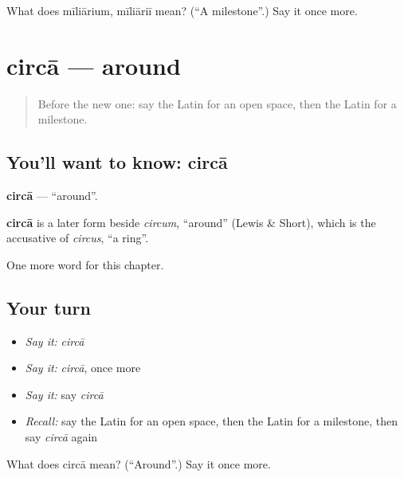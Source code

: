 \begin{tcolorbox}[breakable,colback=teal!4,colframe=teal!35!black,title={Before you move on}]
What does mīliārium, mīliāriī mean? (\textquotedblleft{}A milestone\textquotedblright{}.) Say it once more.
\end{tcolorbox}
\section[circā]{circā — around}

\label{lesson:LA-C119-circa}



\begin{quote}
Before the new one: say the Latin for an open space, then the Latin for a milestone.
\end{quote}

\subsection*{You'll want to know: circā}
\textbf{circā} — \textquotedblleft{}around\textquotedblright{}.

\begin{cousinweb}
\textbf{circā} is a later form beside \emph{circum}, \textquotedblleft{}around\textquotedblright{} (Lewis \& Short), which is the accusative of \emph{circus}, \textquotedblleft{}a ring\textquotedblright{}.
\end{cousinweb}

\begin{grammarlens}[title={What you've built}]
One more word for this chapter.
\end{grammarlens}

\subsection*{Your turn}
\begin{itemize}
\raggedright
  \item \emph{Say it:} \emph{circā}
  \item \emph{Say it:} \emph{circā}, once more
  \item \emph{Say it:} say \emph{circā}
  \item \emph{Recall:} say the Latin for an open space, then the Latin for a milestone, then say \emph{circā} again
\end{itemize}

\begin{tcolorbox}[breakable,colback=teal!4,colframe=teal!35!black,title={Before you move on}]
What does circā mean? (\textquotedblleft{}Around\textquotedblright{}.) Say it once more.
\end{tcolorbox}
